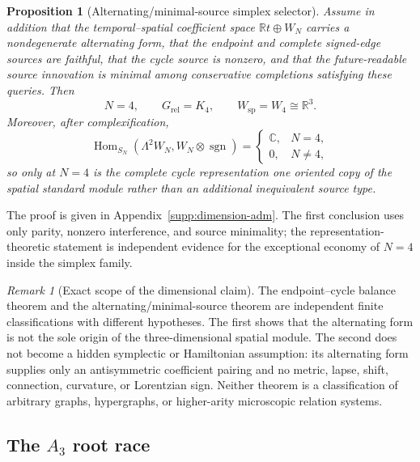 \documentclass[11pt]{article}
\newtheorem{proposition}[proposition]{Proposition}
\theoremstyle{definition}
\theoremstyle{remark}
\newtheorem{remark}[remark]{Remark}
\newcommand{\R}{\mathbb R}
\newcommand{\C}{\mathbb C}
\newcommand{\Hom}{\operatorname{Hom}}
\begin{document}
\begin{proposition}[Alternating/minimal-source simplex selector]
\label{prop:main-alternating-k4}
Assume in addition that the temporal--spatial coefficient space
$\R t\oplus W_N$ carries a nondegenerate alternating form, that the endpoint
and complete signed-edge sources are faithful, that the cycle source is
nonzero, and that the future-readable source innovation is minimal among
conservative completions satisfying these queries.  Then
\begin{equation}
 \boxed{N=4,\qquad G_{\mathrm{rel}}=K_4,
 \qquad W_{\mathrm{sp}}=W_4\cong\R^3.}
 \label{eq:k4-main}
\end{equation}
Moreover, after complexification,
\begin{equation}
 \Hom_{S_N}(\Lambda^2W_N,W_N\otimes\operatorname{sgn})
 =\begin{cases}\C,&N=4,\\0,&N\ne4,\end{cases}
 \label{eq:main-oriented-copy}
\end{equation}
so only at $N=4$ is the complete cycle representation one oriented copy of the
spatial standard module rather than an additional inequivalent source type.
\end{proposition}

The proof is given in Appendix~\ref{supp:dimension-adm}.  The first conclusion
uses only parity, nonzero interference, and source minimality; the
representation-theoretic statement is independent evidence for the exceptional
economy of $N=4$ inside the simplex family.

\begin{remark}[Exact scope of the dimensional claim]
\label{rem:main-dimension-scope}
The endpoint--cycle balance theorem and the alternating/minimal-source theorem
are independent finite classifications with different hypotheses.  The first
shows that the alternating form is not the sole origin of the three-dimensional
spatial module.  The second does not become a hidden symplectic or Hamiltonian
assumption: its alternating form supplies only an antisymmetric coefficient
pairing and no metric, lapse, shift, connection, curvature, or Lorentzian sign.
Neither theorem is a classification of arbitrary graphs, hypergraphs, or
higher-arity microscopic relation systems.
\end{remark}

\subsection{The \texorpdfstring{$A_3$}{A3} root race}
\end{document}
